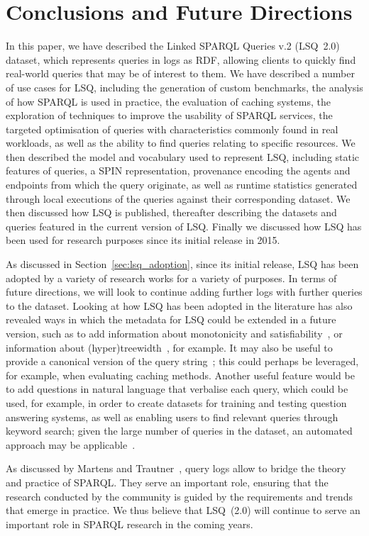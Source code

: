 \section{Conclusions and Future Directions}
\label{sec:conclusion}

In this paper, we have described the Linked SPARQL Queries v.2 (LSQ~2.0) dataset, which represents queries in logs as RDF, allowing clients to quickly find real-world queries that may be of interest to them. We have described a number of use cases for LSQ, including the generation of custom benchmarks, the analysis of how SPARQL is used in practice, the evaluation of caching systems, the exploration of techniques to improve the usability of SPARQL services, the targeted optimisation of queries with characteristics commonly found in real workloads, as well as the ability to find queries relating to specific resources. We then described the model and vocabulary used to represent LSQ, including static features of queries, a SPIN representation, provenance encoding the agents and endpoints from which the query originate, as well as runtime statistics generated through local executions of the queries against their corresponding dataset. We then discussed how LSQ is published, thereafter describing the datasets and queries featured in the current version of LSQ. Finally we discussed how LSQ has been used for research purposes since its initial release in 2015.

As discussed in Section~\ref{sec:lsq_adoption}, since its initial release, LSQ has been adopted by a variety of research works for a variety of purposes. In terms of future directions, we will look to continue adding further logs with further queries to the dataset. Looking at how LSQ has been adopted in the literature has also revealed ways in which the metadata for LSQ could be extended in a future version, such as to add information about monotonicity and satisfiability~\cite{han2016statistical}, or information about (hyper)treewidth~\cite{BonifatiMT17,bonifati2018darql}, for example. It may also be useful to provide a canonical version of the query string~\cite{SalasH18}; this could perhaps be leveraged, for example, when evaluating caching methods. Another useful feature would be to add questions in natural language that verbalise each query, which could be used, for example, in order to create datasets for training and testing question answering systems, as well as enabling users to find relevant queries through keyword search; given the large number of queries in the dataset, an automated approach may be applicable~\cite{NgomoBULG13}.

As discussed by Martens and Trautner~\cite{MartensT19}, query logs allow to bridge the theory and practice of SPARQL. They serve an important role, ensuring that the research conducted by the community is guided by the requirements and trends that emerge in practice. We thus believe that LSQ~(2.0) will continue to serve an important role in SPARQL research in the coming years.


